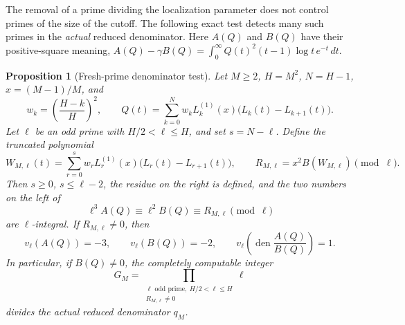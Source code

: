 \documentclass[11pt,a4paper]{article}
\newtheorem{proposition}[theorem]{Proposition}
\theoremstyle{definition}
\theoremstyle{remark}
\begin{document}
The removal of a prime dividing the localization parameter does not
control primes of the size of the cutoff.  The following exact test
detects many such primes in the \emph{actual} reduced denominator.
Here $A(Q)$ and $B(Q)$ have their positive-square meaning,
$A(Q)-\gamma B(Q)=\int_0^\infty Q(t)^2(t-1)\log t\,e^{-t}\,dt$.

\begin{proposition}[Fresh-prime denominator test]
\label{prop:stage3-fresh-prime}
Let $M\ge2$, $H=M^2$, $N=H-1$, $x=(M-1)/M$, and
\[
 w_k=\left(\frac{H-k}{H}\right)^2,\qquad
 Q(t)=\sum_{k=0}^{N}w_kL_k^{(1)}(x)
                    \bigl(L_k(t)-L_{k+1}(t)\bigr).
\]
Let $\ell$ be an odd prime with $H/2<\ell\le H$, and set
$s=N-\ell$.  Define the truncated polynomial
\[
 W_{M,\ell}(t)=\sum_{r=0}^{s}w_rL_r^{(1)}(x)
                    \bigl(L_r(t)-L_{r+1}(t)\bigr),\qquad
 R_{M,\ell}=x^2B(W_{M,\ell})\pmod\ell.
\]
Then $s\ge0$, $s\le\ell-2$, the residue on the right is defined,
and the two numbers on the left of
\begin{equation}
 \ell^3A(Q)\equiv\ell^2B(Q)\equiv R_{M,\ell}\pmod\ell
 \label{eq:stage3-fresh-prime-residue}
\end{equation}
are $\ell$-integral.  If $R_{M,\ell}\ne0$, then
\[
 v_\ell(A(Q))=-3,\qquad v_\ell(B(Q))=-2,\qquad
 v_\ell\!\left(\operatorname{den}\frac{A(Q)}{B(Q)}\right)=1.
\]
In particular, if $B(Q)\ne0$, the completely computable integer
\[
 G_M=\prod_{\substack{\ell\text{ odd prime},\ H/2<\ell\le H\\
                         R_{M,\ell}\ne0}}\ell
\]
divides the actual reduced denominator $q_M$.
\end{proposition}
\end{document}
